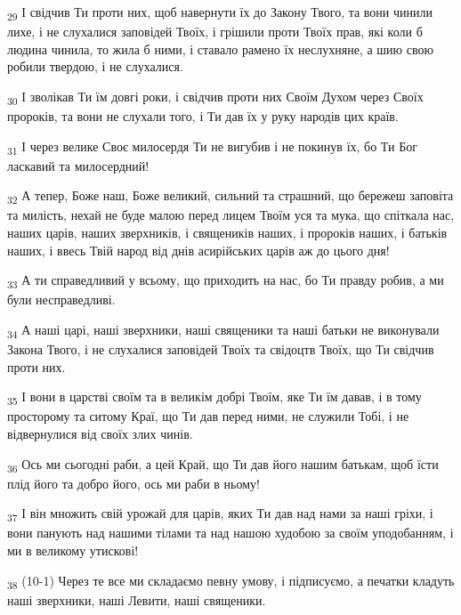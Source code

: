 \begin{tcolorbox}
\textsubscript{29} І свідчив Ти проти них, щоб навернути їх до Закону Твого, та вони чинили лихе, і не слухалися заповідей Твоїх, і грішили проти Твоїх прав, які коли б людина чинила, то жила б ними, і ставало рамено їх неслухняне, а шию свою робили твердою, і не слухалися.
\end{tcolorbox}
\begin{tcolorbox}
\textsubscript{30} І зволікав Ти їм довгі роки, і свідчив проти них Своїм Духом через Своїх пророків, та вони не слухали того, і Ти дав їх у руку народів цих країв.
\end{tcolorbox}
\begin{tcolorbox}
\textsubscript{31} І через велике Своє милосердя Ти не вигубив і не покинув їх, бо Ти Бог ласкавий та милосердний!
\end{tcolorbox}
\begin{tcolorbox}
\textsubscript{32} А тепер, Боже наш, Боже великий, сильний та страшний, що бережеш заповіта та милість, нехай не буде малою перед лицем Твоїм уся та мука, що спіткала нас, наших царів, наших зверхників, і священиків наших, і пророків наших, і батьків наших, і ввесь Твій народ від днів асирійських царів аж до цього дня!
\end{tcolorbox}
\begin{tcolorbox}
\textsubscript{33} А ти справедливий у всьому, що приходить на нас, бо Ти правду робив, а ми були несправедливі.
\end{tcolorbox}
\begin{tcolorbox}
\textsubscript{34} А наші царі, наші зверхники, наші священики та наші батьки не виконували Закона Твого, і не слухалися заповідей Твоїх та свідоцтв Твоїх, що Ти свідчив проти них.
\end{tcolorbox}
\begin{tcolorbox}
\textsubscript{35} І вони в царстві своїм та в великім добрі Твоїм, яке Ти їм давав, і в тому просторому та ситому Краї, що Ти дав перед ними, не служили Тобі, і не відвернулися від своїх злих чинів.
\end{tcolorbox}
\begin{tcolorbox}
\textsubscript{36} Ось ми сьогодні раби, а цей Край, що Ти дав його нашим батькам, щоб їсти плід його та добро його, ось ми раби в ньому!
\end{tcolorbox}
\begin{tcolorbox}
\textsubscript{37} І він множить свій урожай для царів, яких Ти дав над нами за наші гріхи, і вони панують над нашими тілами та над нашою худобою за своїм уподобанням, і ми в великому утискові!
\end{tcolorbox}
\begin{tcolorbox}
\textsubscript{38} (10-1) Через те все ми складаємо певну умову, і підписуємо, а печатки кладуть наші зверхники, наші Левити, наші священики.
\end{tcolorbox}
